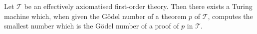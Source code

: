 Let $\mathcal{T}$ be an effectively axiomatised first-order theory. Then there exists a Turing machine which, when given the Gödel number of a theorem $p$ of $\mathcal{T}$, computes the smallest number which is the Gödel number of a proof of $p$ in $\mathcal{T}$.
